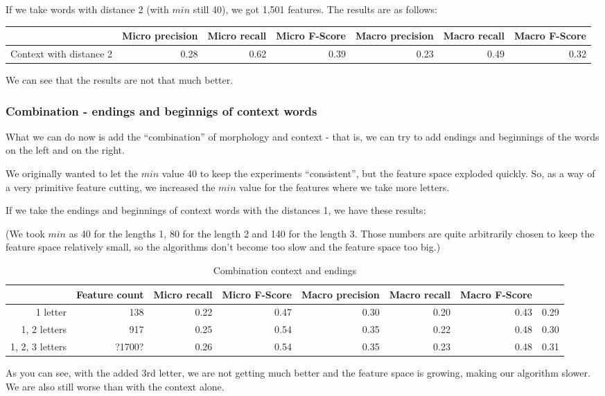 \documentclass[letterpaper]{article}
\begin{document}
If we take words with distance 2 (with $min$ still 40), we got 1,501 features. The results are as follows:

\begin{tabular}{|r|r|r|r|r|r|r|}
 \hline
 & \textbf{Micro precision} &  \textbf{Micro recall}  &  \textbf{Micro F-Score} & \textbf{Macro precision} &  \textbf{Macro recall}  &  \textbf{Macro F-Score} \\ \hline
Context with distance 2 & 0.28 & 0.62 & 0.39 & 0.23 & 0.49 & 0.32 \\ \hline
\end{tabular}

We can see that the results are not that much better.

\subsubsection{Combination - endings and beginnigs of context words}
What we can do now is add the ``combination'' of morphology and context - that is, 
we can try to add endings and beginnings of the words on the left and on the right.

We originally wanted to let the $min$ value 40 to keep the experiments ``consistent'',
but the feature space exploded quickly. So, as a way of a very primitive feature cutting,
we increased the $min$ value for the features where we take more letters.

If we take the endings and beginnings of context words with the distances 1, we have these results:

(We took $min$ as 40 for the lengths 1, 80 for the length 2 and 140 for the length 3. 
Those numbers are quite arbitrarily chosen to keep the feature space relatively small, 
so the algorithms don't become too slow and the feature space too big.)

\begin{table}
\begin{tabular}{|r|r|r|r|r|r|r|r|}
     & \textbf{Feature count} &  \textbf{Micro recall}  &  \textbf{Micro F-Score} & \textbf{Macro precision} &  \textbf{Macro recall}  &  \textbf{Macro F-Score} \\ \hline
1 letter & 138 & 0.22 & 0.47 & 0.30 & 0.20 & 0.43 & 0.29 \\ \hline
1, 2 letters & 917 & 0.25 & 0.54 & 0.35 & 0.22 & 0.48 & 0.30 \\ \hline
1, 2, 3 letters & ?1700? & 0.26 & 0.54 & 0.35 & 0.23 & 0.48 & 0.31 \\ \hline

\end{tabular}
\caption{Combination context and endings}
\end{table}
As you can see, with the added 3rd letter, we are not getting much better and 
the feature space is growing, making our algorithm slower. We are also still worse than with the context alone.
\end{document}
